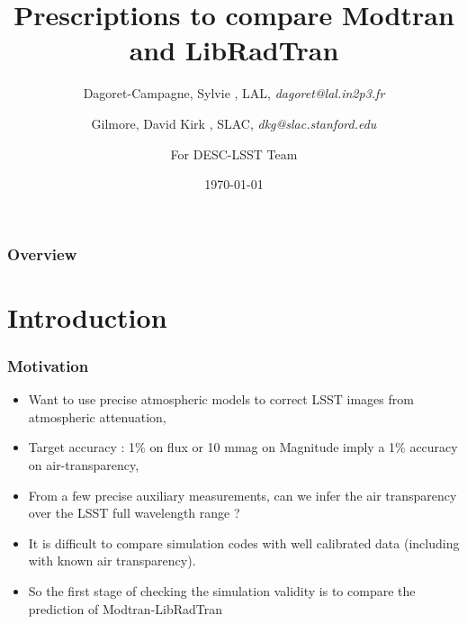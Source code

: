 \documentclass{beamer}
\title[MT-RT Comparison]{Prescriptions to compare Modtran and LibRadTran} %
\author{
Dagoret-Campagne, Sylvie  ,  LAL, %
\textit{dagoret@lal.in2p3.fr} %
\\
\and
Gilmore, David Kirk , SLAC,
\textit{dkg@slac.stanford.edu} %
\and
For DESC-LSST Team
}
\date{\today} %
\begin{document}
\begin{frame}
\titlepage %
\end{frame}

\begin{frame}
\frametitle{Overview} %
\tableofcontents %
\end{frame}



\section{Introduction}

\begin{frame}
\frametitle{Motivation}
\begin{itemize}
\item Want to use precise atmospheric models to correct LSST images from atmospheric attenuation,
\item Target accuracy : 1\% on flux or 10 mmag on Magnitude imply a 1\% accuracy on air-transparency,
\item From a few precise auxiliary measurements, can we infer the air transparency over the LSST full wavelength range ?
\item It is difficult to compare simulation codes with well calibrated data (including with known air  transparency).
\item So the first stage of checking the simulation validity is to compare the prediction of Modtran-LibRadTran
\end{itemize}
\end{frame}
\end{document}
